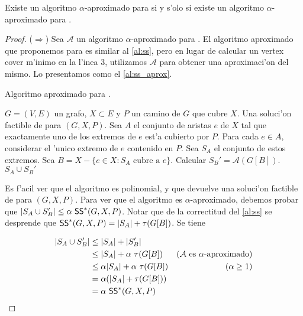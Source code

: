 \begin{theorem}
\label{th:ss_vc_aproximados}
Existe un algoritmo $\alpha$-aproximado para  si y s'olo si existe un algoritmo $\alpha$-aproximado para .

\begin{proof}

($\Rightarrow$) Sea $\mathcal{A}$ un algoritmo $\alpha$-aproximado para . El algoritmo aproximado que proponemos para  es similar al \autoref{al:ss}, pero en lugar de calcular un vertex cover m'inimo en la l'inea 3, utilizamos $\mathcal{A}$ para obtener una aproximaci'on del mismo. Lo presentamos como el  \autoref{al:ss_aprox}.

\begin{algorithm}
  \caption{Algoritmo aproximado para .}
  \label{al:ss_aprox}
  \begin{algorithmic}[1]
  	\Require $G = (V, E)$ un grafo, $X \subset E$ y $P$ un camino de $G$ que cubre $X$.
  	\Ensure Una soluci'on factible de  para $(G, X, P)$.
  	\State Sea $A$ el conjunto de aristas $e$ de $X$ tal que exactamente uno de los extremos de $e$ est'a cubierto por $P$.
  	\State Para cada $e \in A$, considerar el 'unico extremo de $e$ contenido en $P$. Sea $S_A$ el conjunto de estos extremos.
	\State Sea $B = X - \{e \in X : S_A \text{ cubre a }e \}$. Calcular $S_B' = \mathcal{A}(G[B])$.
	\Return $S_A \cup S_B'$
  \end{algorithmic}
\end{algorithm}

Es f'acil ver que el algoritmo es polinomial, y que devuelve una soluci'on factible de  para $(G, X, P)$. Para ver que el algoritmo es $\alpha$-aproximado, debemos probar que $|S_A \cup S_B'| \leq \alpha \text{ } \textnormal{\textsf{SS}}^*(G, X, P)$. Notar que de la correctitud del \autoref{al:ss} se desprende que $\textnormal{\textsf{SS}}^*(G, X, P) = |S_A| + \tau(G[B])$. Se tiene

\begin{align*}
|S_A \cup S_B'| &\leq |S_A| + |S_B'| &\\
&\leq |S_A| + \alpha \text{ } \tau(G[B]) &\text{(} \mathcal{A} \text{ es } \alpha \text{-aproximado)}\\
&\leq \alpha|S_A| + \alpha \text{ } \tau(G[B]) & \text{(} \alpha \geq 1 \text{)}\\
&= \alpha(|S_A| + \tau(G[B]))&\\
&= \alpha \text{ } \textnormal{\textsf{SS}}^*(G, X, P)&
\end{align*}


\end{proof}
\end{theorem}
